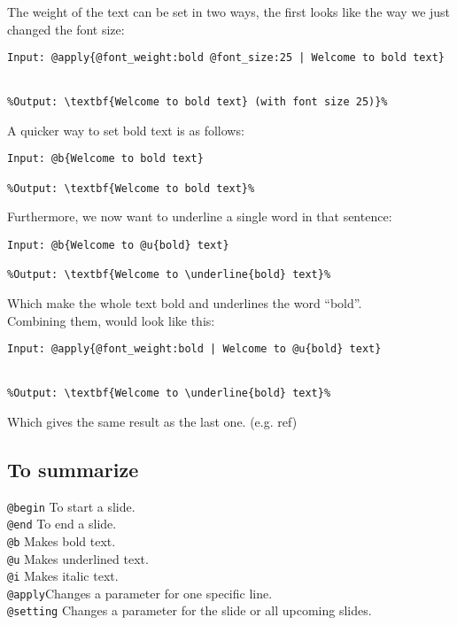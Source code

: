 The weight of the text can be set in two ways, the first looks like the way we just changed the font size: \\

\begin{lstlisting}[frame=single]
Input: @apply{@font_weight:bold @font_size:25 | Welcome to bold text}


%Output: \textbf{Welcome to bold text} (with font size 25)}%
\end{lstlisting}

A quicker way to set bold text is as follows: \\

\begin{lstlisting}[frame=single]
Input: @b{Welcome to bold text}

%Output: \textbf{Welcome to bold text}%
\end{lstlisting}
Furthermore, we now want to underline a single word in that sentence: \\

\begin{lstlisting}[frame=single]
Input: @b{Welcome to @u{bold} text}

%Output: \textbf{Welcome to \underline{bold} text}%
\end{lstlisting}
Which make the whole text bold and underlines the word ``bold''.\\
Combining them, would look like this:\\

\begin{lstlisting}[frame=single]
Input: @apply{@font_weight:bold | Welcome to @u{bold} text}


%Output: \textbf{Welcome to \underline{bold} text}%
\end{lstlisting}
Which gives the same result as the last one. (e.g. ref)

\subsection*{To summarize}
\texttt{@begin} To start a slide. \\
\texttt{@end} To end a slide. \\
\texttt{@b} Makes bold text. \\
\texttt{@u} Makes underlined text. \\
\texttt{@i} Makes italic text. \\
\texttt{@apply}Changes a parameter for one specific line. \\
\texttt{@setting} Changes a parameter for the slide or all upcoming slides.\\

